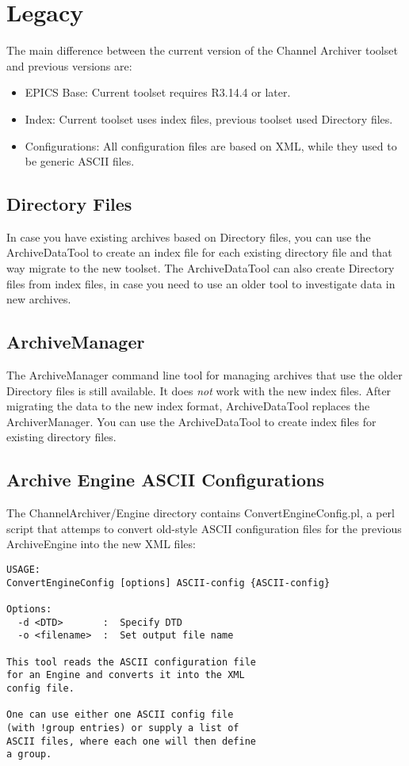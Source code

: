 \chapter{Legacy}
The main difference between the current version of the Channel Archiver toolset
and previous versions are:
\begin{itemize}
\item EPICS Base: Current toolset requires R3.14.4 or later.
\item Index: Current toolset uses index files, previous toolset
      used Directory files.
\item Configurations: All configuration files are based on XML,
      while they used to be generic ASCII files.
\end{itemize}

\section{Directory Files}
In case you have existing archives based on Directory files,
you can use the ArchiveDataTool to create an index file for each existing directory file
and that way migrate to the new toolset.
The ArchiveDataTool can also create Directory files from index files, in case you
need to use an older tool to investigate data in new archives.

\section{ArchiveManager}
The ArchiveManager command line tool for managing archives that use the
older Directory files is still available.
It does \emph{not} work with the new index files.
After migrating the data to the new index format,
ArchiveDataTool replaces the ArchiverManager. You can use the ArchiveDataTool
to create index files for existing directory files.

\section{Archive Engine ASCII Configurations} \label{sec:ASCIIConfig}
The ChannelArchiver/Engine directory contains ConvertEngineConfig.pl,
a perl script that attemps to convert old-style ASCII configuration
files for the previous ArchiveEngine into the new XML files:
\begin{lstlisting}[keywordstyle=\sffamily]
USAGE:
ConvertEngineConfig [options] ASCII-config {ASCII-config}
 
Options:
  -d <DTD>       :  Specify DTD
  -o <filename>  :  Set output file name
 
This tool reads the ASCII configuration file
for an Engine and converts it into the XML
config file.
 
One can use either one ASCII config file
(with !group entries) or supply a list of
ASCII files, where each one will then define
a group.
\end{lstlisting}

